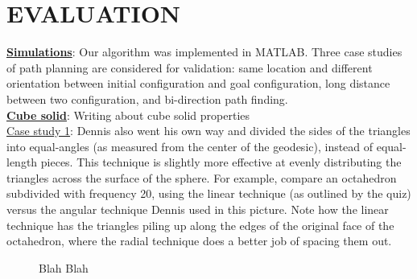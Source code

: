 \section{EVALUATION}
\uline{\textbf{Simulations}}: Our algorithm was implemented in MATLAB. Three case studies of path planning are considered for validation: same location and different orientation between initial configuration and goal configuration, long distance between two configuration, and bi-direction path finding.\\

\noindent\uline{\textbf{Cube solid}}:
Writing about cube solid properties\\

\noindent\uline{Case study 1}: Dennis also went his own way and divided the sides of the triangles into equal-angles (as measured from the center of the geodesic), instead of equal-length pieces. This technique is slightly more effective at evenly distributing the triangles across the surface of the sphere. For example, compare an octahedron subdivided with frequency 20, using the linear technique (as outlined by the quiz) versus the angular technique Dennis used in this picture. Note how the linear technique has the triangles piling up along the edges of the original face of the octahedron, where the radial technique does a better job of spacing them out.
\begin{center}
\begin{figure}[h]
\hfill
{}
\caption{Blah Blah}
\end{figure}
\end{center}

